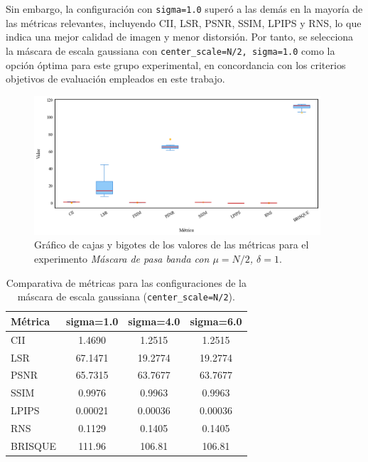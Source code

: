 Sin embargo, la configuración con \texttt{sigma=1.0} superó a las demás en la mayoría de las métricas relevantes, incluyendo CII, LSR, PSNR, SSIM, LPIPS y RNS, lo que indica una mejor calidad de imagen y menor distorsión. Por tanto, se selecciona la máscara de escala gaussiana con \texttt{center\_scale=N/2, sigma=1.0} como la opción óptima para este grupo experimental, en concordancia con los criterios objetivos de evaluación empleados en este trabajo.

\begin{figure}[H]
    \centering
    \includegraphics[width=0.95\textwidth]{Graphics/boxplot-gaussian-mask.png}
    \caption{Gráfico de cajas y bigotes de los valores de las métricas para el experimento \textit{Máscara de pasa banda con $\mu = N/2$, $\delta=1$}.}
    \label{fig:boxplot-enhancement}
\end{figure}

\begin{table}[H]
    \centering
    \caption{Comparativa de métricas para las configuraciones de la máscara de escala gaussiana (\texttt{center\_scale=N/2}).}
    \begin{tabular}{|l|c|c|c|}
    \hline
    \textbf{Métrica} & \textbf{sigma=1.0} & \textbf{sigma=4.0} & \textbf{sigma=6.0} \\
    \hline
    CII & 1.4690 & 1.2515 & 1.2515 \\
    LSR & 67.1471 & 19.2774 & 19.2774 \\
    PSNR & 65.7315 & 63.7677 & 63.7677 \\
    SSIM & 0.9976 & 0.9963 & 0.9963 \\
    LPIPS & 0.00021 & 0.00036 & 0.00036 \\
    RNS & 0.1129 & 0.1405 & 0.1405 \\
    BRISQUE & 111.96 & 106.81 & 106.81 \\
    \hline
    \end{tabular}
    \label{tab:gaussian_comparativa}
\end{table}

